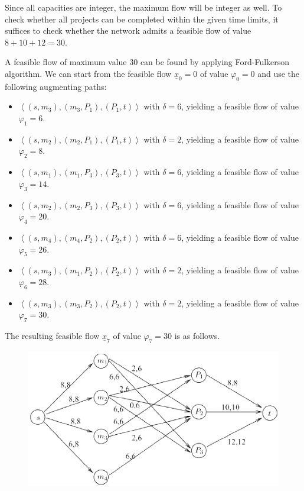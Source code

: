\documentclass[12pt, a4paper]{report}
\newtheorem[style=M,bodystyle=\normalfont]{theorem}{Theorem}
\newtheorem[style=M,bodystyle=\normalfont]{corollary}{Corollary}
\newtheorem[style=M,bodystyle=\normalfont]{lemma}{Lemma}
\newtheorem[style=M,bodystyle=\normalfont]{definition}{Definition}
\begin{document}
        Since all capacities are integer, the maximum flow will be integer as well. To check whether all projects can be completed within the given time limits, it suffices to check 
        whether the network admits a feasible flow of value $8 + 10 + 12 = 30$.

        A feasible flow of maximum value $30$ can be found by applying Ford-Fulkerson algorithm. We can start from the feasible flow $\underline{x}_0 = 0$ of value $\varphi_0 = 0$ 
        and use the following augmenting paths:
        \begin{itemize}
            \item $\left\langle (s, m_3),(m_3, P_1),(P_1, t) \right\rangle$ with $\delta = 6$, yielding a feasible flow of value $\varphi_1 = 6$.
            \item $\left\langle (s, m_2),(m_2, P_1),(P_1, t) \right\rangle$ with $\delta = 2$, yielding a feasible flow of value $\varphi_2 = 8$.
            \item $\left\langle (s, m_1),(m_1, P_3),(P_3, t) \right\rangle$ with $\delta = 6$, yielding a feasible flow of value $\varphi_3 = 14$.
            \item $\left\langle (s, m_2),(m_2, P_3),(P_3, t) \right\rangle$ with $\delta = 6$, yielding a feasible flow of value $\varphi_4 = 20$.
            \item $\left\langle (s, m_4),(m_4, P_2),(P_2, t) \right\rangle$ with $\delta = 6$, yielding a feasible flow of value $\varphi_5 = 26$.
            \item $\left\langle (s, m_3),(m_1, P_2),(P_2, t) \right\rangle$ with $\delta = 2$, yielding a feasible flow of value $\varphi_6 = 28$.
            \item $\left\langle (s, m_3),(m_3, P_2),(P_2, t) \right\rangle$ with $\delta = 2$, yielding a feasible flow of value $\varphi_7 = 30$.
        \end{itemize}
        The resulting feasible flow $\underline{x}_7$ of value $\varphi_7 = 30$ is as follows.
        \begin{figure}[H]
            \centering
            \includegraphics[width=0.5\linewidth]{images/inflow2.png}
        \end{figure}
\end{document}
